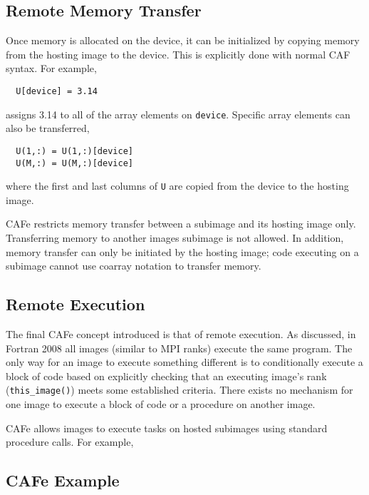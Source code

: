 \subsection{Remote Memory Transfer}

Once memory is allocated on the device, it can be initialized by copying memory from the
hosting image to the device.  This is explicitly done with normal CAF syntax.  For example,
\begin{verbatim}
  U[device] = 3.14
\end{verbatim}
assigns 3.14 to all of the array elements on \texttt{device}.  Specific array elements
can also be transferred, 
\begin{verbatim}
  U(1,:) = U(1,:)[device]
  U(M,:) = U(M,:)[device]
\end{verbatim}
where the first and last columns of \texttt{U} are copied from the device to the hosting image.

CAFe restricts memory transfer between a subimage and its hosting image only. Transferring
memory to another images subimage is not allowed.  In addition, memory transfer can only be
initiated by the hosting image; code executing on a subimage cannot use coarray notation to
transfer memory.

\subsection{Remote Execution}

The final CAFe concept introduced is that of remote execution.  As discussed, in Fortran 2008
all images (similar to MPI ranks) execute the same program.  The only way for an image
to execute something different is to conditionally execute a block of code based on explicitly
checking that an executing image's rank (\texttt{this\_image()}) meets some established criteria.
There exists no mechanism for one image to execute a block of code or a procedure on another
image.

CAFe allows images to execute tasks on hosted subimages using standard procedure calls.
For example,


\subsection{CAFe Example}

